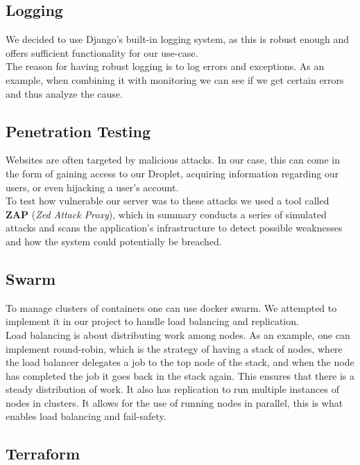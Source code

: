\subsection*{Logging}

We decided to use Django's built-in logging system, as this is robust enough and offers sufficient functionality for our use-case.\\
The reason for having robust logging is to log errors and exceptions. As an example, when combining it with monitoring we can see if we get certain errors and thus analyze the cause.

\subsection*{Penetration Testing}

Websites are often targeted by malicious attacks. In our case, this can come in the form of gaining access to our Droplet, acquiring information regarding our users, or even hijacking a user's account.
\\
To test how vulnerable our server was to these attacks we used a tool called \textbf{ZAP} (\textit{Zed Attack Proxy}), which in summary conducts a series of simulated attacks and scans the application's infrastructure to detect possible weaknesses and how the system could potentially be breached.

\subsection*{Swarm}
To manage clusters of containers one can use docker swarm. We attempted to implement it in our project to handle load balancing and replication.
\\
Load balancing is about distributing work among nodes. As an example, one can implement round-robin, which is the strategy of having a stack of nodes, where the load balancer delegates a job to the top node of the stack, and when the node has completed the job it goes back in the stack again. This ensures that there is a steady distribution of work.
It also has replication to run multiple instances of nodes in clusters. It allows for the use of running nodes in parallel, this is what enables load balancing and fail-safety.

\subsection*{Terraform}

